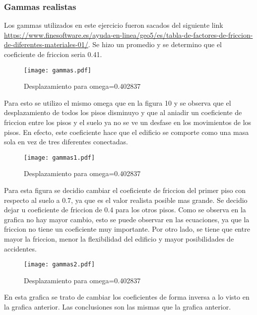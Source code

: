 \documentclass[11pt,letterpaper]{exam}
\begin{document}
\subsubsection{Gammas realistas}
Los gammas utilizados en este ejercicio fueron sacados del siguiente link \url{https://www.finesoftware.es/ayuda-en-linea/geo5/es/tabla-de-factores-de-friccion-de-diferentes-materiales-01/}. Se hizo un promedio y se determino que el coeficiente de friccion seria 0.41. 
\begin{figure}[H]
    \centering
    \texttt{[image: gammas.pdf]}
    \caption{Desplazamiento para omega=0.402837}
    \label{fig:my_label}
\end{figure}
Para esto se utilizo el mismo omega que en la figura 10 y se observa que el desplazamiento de todos los pisos disminuyo y que al aniadir un coeficiente de friccion entre los pisos y el suelo ya no se ve un desfase en los movimientos de los pisos. En efecto, este coeficiente hace que el edificio se comporte como una masa sola en vez de tres diferentes conectadas. 
\begin{figure}[H]
    \centering
    \texttt{[image: gammas1.pdf]}
    \caption{Desplazamiento para omega=0.402837}
    \label{fig:my_label}
\end{figure}
Para esta figura se decidio cambiar el coeficiente de friccion del primer piso con respecto al suelo a 0.7, ya que es el valor realista posible mas grande. Se decidio dejar u coeficiente de friccion de 0.4 para los otros pisos. Como se observa en la grafica no hay mayor cambio, esto se puede observar en las ecuaciones, ya que la friccion no tiene un coeficiente muy importante. 
Por  otro lado, se tiene que entre mayor la friccion, menor la flexibilidad del edificio y mayor posibilidades de accidentes. 
\begin{figure}[H]
    \centering
    \texttt{[image: gammas2.pdf]}
    \caption{Desplazamiento para omega=0.402837}
    \label{fig:my_label}
\end{figure}
En esta grafica se trato de cambiar los coeficientes de forma inversa a lo visto en la grafica anterior. Las conclusiones son las mismas que la grafica anterior. 
\end{document}

